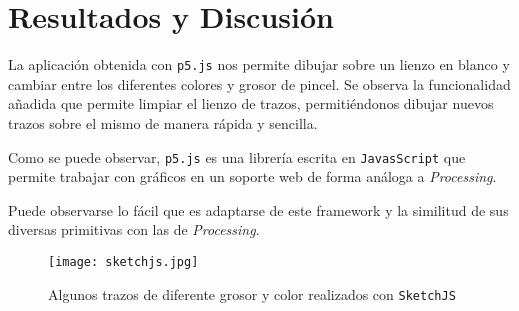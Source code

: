 \documentclass[10pt,a4paper]{report}
\begin{document}
	
	
	
	\chapter{Resultados y Discusión}\label{chap:discuss}
	La aplicación obtenida con \texttt{p5.js} nos permite dibujar sobre un lienzo en blanco y cambiar entre los diferentes colores y grosor de pincel. Se observa la funcionalidad añadida que permite limpiar el lienzo de trazos, permitiéndonos dibujar nuevos trazos sobre el mismo de manera rápida y sencilla.
	
	Como se puede observar, \texttt{p5.js} es una librería escrita en \texttt{JavasScript} que permite trabajar con gráficos en un soporte web de forma análoga a \textit{Processing}.
	
	Puede observarse lo fácil que es adaptarse de este framework y la similitud de sus diversas primitivas con las de \textit{Processing}.
		
	\begin{figure}[h]
		\centering
		\texttt{[image: sketchjs.jpg]}
		\caption{Algunos trazos de diferente grosor y color realizados con \texttt{SketchJS}}
	\end{figure}
	
	
	
\end{document}

